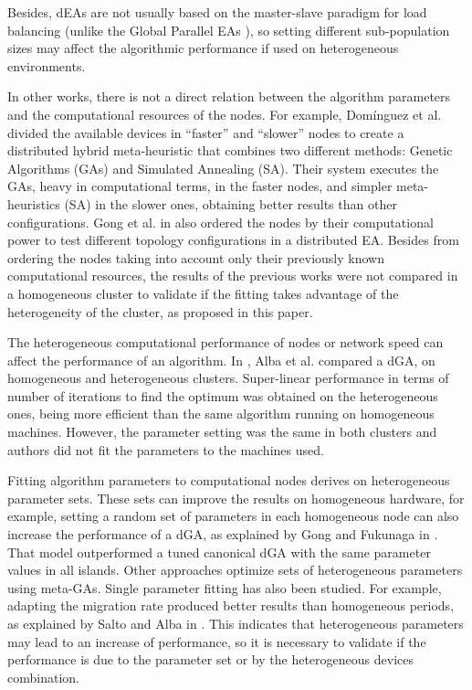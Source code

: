\documentclass[final,1p,times]{elsarticle}
\begin{document}
 Besides, dEAs are not usually based on the master-slave paradigm for
load balancing (unlike the Global Parallel EAs
\cite{alba2002parallelism}), so setting different sub-population sizes
may affect the algorithmic performance if used on heterogeneous
environments. 

In other works, there is not a direct relation between the algorithm parameters and the
computational resources of the nodes. For example, Dom\'inguez et al. \cite{HYDROCM} 
divided the available devices in ``faster'' and ``slower'' nodes to create a distributed hybrid 
meta-heuristic that combines two different methods: Genetic Algorithms (GAs) and Simulated
Annealing (SA). Their system executes the GAs, heavy in computational
terms, in the faster nodes, and
simpler meta-heuristics (SA) in the slower ones, obtaining better results
than other configurations.  Gong et al. in \cite{HETEROGENEOUSTOPOLOGY} also ordered 
the nodes by their computational power to test different topology configurations in a distributed EA.
Besides from ordering the nodes taking into account 
only their previously known computational resources, the results of the previous works were not compared in a homogeneous 
cluster to validate if the fitting takes advantage of the heterogeneity 
of the cluster, as proposed in this paper.

The heterogeneous computational performance of nodes or network speed can affect the performance of an algorithm. In \cite{HETEROGENEOUSHARD},
 Alba et al. compared a dGA, 
 on homogeneous and heterogeneous clusters. 
 Super-linear performance in terms of number of iterations to find the optimum was obtained on the heterogeneous ones,
 being more efficient than the same algorithm running on homogeneous
 machines. However, the parameter setting was the same in both
 clusters and authors did not fit the parameters to the machines used. 



Fitting algorithm parameters to computational nodes derives on heterogeneous parameter sets. These sets can improve the results on homogeneous hardware, for example, setting a random set of parameters in each homogeneous node can also increase the
performance of a dGA, as explained by Gong
and Fukunaga in \cite{HETEROGENEOUSPARAMETERS}. That model
outperformed a tuned canonical dGA with the same parameter values in
all islands. Other approaches \cite{PanaceasClune05,ParallelGATongchim02} optimize sets of heterogeneous parameters using meta-GAs. Single parameter fitting has also been  studied. For example, adapting the migration rate produced better
results than homogeneous periods, as explained by Salto and Alba in
\cite{HETEROGENEOUSMIGRATION}. This indicates that heterogeneous parameters
 may lead to an increase of performance, so it is necessary to validate if the 
 performance is due to the parameter set or by the heterogeneous devices combination.
\end{document}
